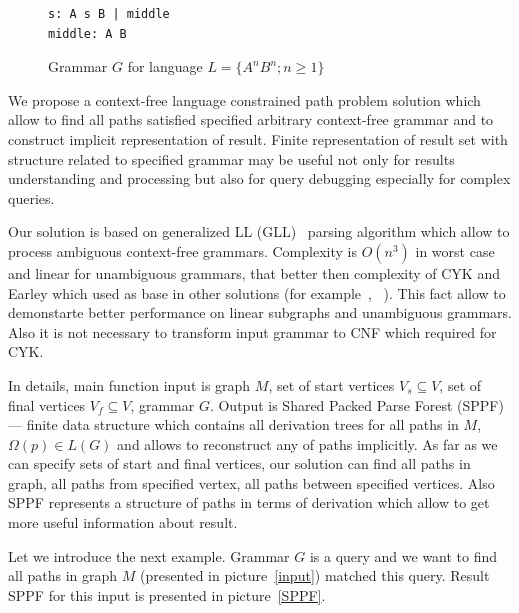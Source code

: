 \documentclass{sig-alternate} %
\begin{document}
\begin{figure}[h]
   \begin{center}
\begin{verbatim}
s: A s B | middle
middle: A B
\end{verbatim}
   \caption{Grammar $G$ for language $L=\{A^n B^n; n \geq 1\}$}
   \label{grammarG}        
   \end{center}
\end{figure}

We propose a context-free language constrained path problem solution which allow to find all paths satisfied specified arbitrary context-free grammar and to construct implicit representation of result. 
Finite representation of result set with structure related to specified grammar may be useful not only for results understanding and processing but also for query debugging especially for complex queries. 

Our solution is based on generalized LL (GLL)~\cite{scott2010gll} parsing algorithm which allow to process ambiguous context-free grammars.
Complexity is $O(n^3)$ in worst case and linear for unambiguous grammars, that better then complexity of CYK and Earley which used as base in other solutions (for example~\cite{ConjCFPathQuery}, ~\cite{GraphQueryWithEarley}).
This fact allow to demonstarte better performance on linear subgraphs and unambiguous grammars.
Also it is not necessary to transform input grammar to CNF which required for CYK.

In details, main function input is graph $M$, set of start vertices $V_s\subseteq V$, set of final vertices $V_f\subseteq V$, grammar $G$.
Output is Shared Packed Parse Forest (SPPF)~\cite{SPPF} --- finite data structure which contains all derivation trees for all paths in $M$, $\Omega(p) \in L(G)$ and allows to reconstruct any of paths implicitly.
As far as we can specify sets of start and final vertices, our solution can find all paths in graph, all paths from specified vertex, all paths between specified vertices. 
Also SPPF represents a structure of paths in terms of derivation which allow to get more useful information about result.

Let we introduce the next example. Grammar $G$ is a query and we want to find all paths in graph $M$ (presented in picture~\ref{input}) matched this query.
Result SPPF for this input is presented in picture~\ref{SPPF}. 
\end{document}
